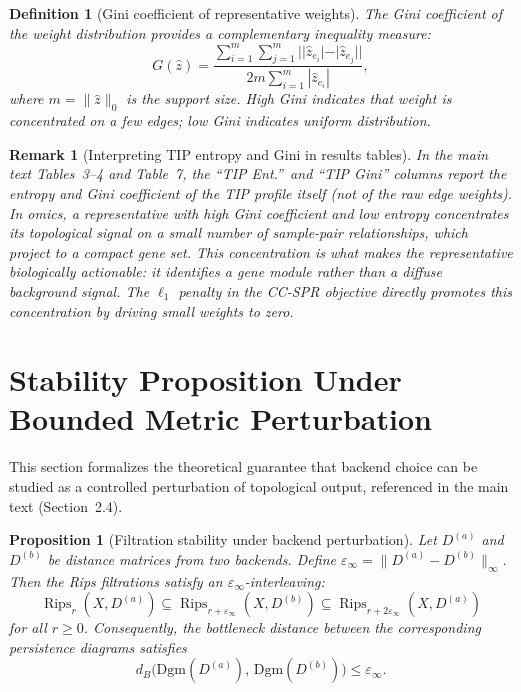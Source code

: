 \documentclass[11pt]{article}
\newtheorem{proposition}[theorem]{Proposition}
\newtheorem{definition}[theorem]{Definition}
\newtheorem{remark}[theorem]{Remark}
\DeclareMathOperator{\Rips}{Rips}
\begin{document}
\begin{definition}[Gini coefficient of representative weights]\label{def:supp_gini}
The \emph{Gini coefficient} of the weight distribution provides a complementary inequality measure:
\[
G(\hat{z}) = \frac{\sum_{i=1}^m \sum_{j=1}^m ||\hat{z}_{e_i}| - |\hat{z}_{e_j}||}{2m \sum_{i=1}^m |\hat{z}_{e_i}|},
\]
where $m = \|\hat{z}\|_0$ is the support size.
High Gini indicates that weight is concentrated on a few edges; low Gini indicates uniform distribution.
\end{definition}

\begin{remark}[Interpreting TIP entropy and Gini in results tables]\label{rem:supp_concentration}
In the main text Tables~3--4 and Table~7, the ``TIP Ent.''\ and ``TIP Gini'' columns report the entropy and Gini coefficient of the TIP profile itself (not of the raw edge weights).
In omics, a representative with high Gini coefficient and low entropy concentrates its topological signal on a small number of sample-pair relationships, which project to a compact gene set.
This concentration is what makes the representative biologically actionable: it identifies a gene module rather than a diffuse background signal.
The $\ell_1$ penalty in the CC-SPR objective directly promotes this concentration by driving small weights to zero.
\end{remark}


\section{Stability Proposition Under Bounded Metric Perturbation}
\label{sec:supp_stability}

This section formalizes the theoretical guarantee that backend choice can be studied as a controlled perturbation of topological output, referenced in the main text (Section~2.4).

\begin{proposition}[Filtration stability under backend perturbation]\label{prop:supp_stability}
Let $D^{(a)}$ and $D^{(b)}$ be distance matrices from two backends.
Define $\varepsilon_\infty = \|D^{(a)} - D^{(b)}\|_\infty$.
Then the Rips filtrations satisfy an $\varepsilon_\infty$-interleaving:
\[
\Rips_r(X, D^{(a)}) \subseteq \Rips_{r + \varepsilon_\infty}(X, D^{(b)}) \subseteq \Rips_{r + 2\varepsilon_\infty}(X, D^{(a)})
\]
for all $r \ge 0$.
Consequently, the bottleneck distance between the corresponding persistence diagrams satisfies
\[
d_B\bigl(\mathrm{Dgm}(D^{(a)}),\, \mathrm{Dgm}(D^{(b)})\bigr) \le \varepsilon_\infty.
\]
\end{proposition}
\end{document}
